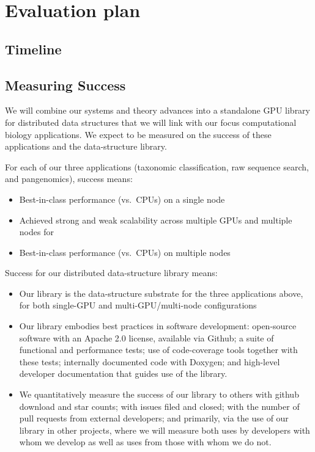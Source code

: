 \section{Evaluation plan}


\subsection{Timeline}

\subsection{Measuring Success} We will combine our systems and theory advances into a standalone GPU library for distributed data structures that we will link with our focus computational biology applications. We expect to be measured on the success of these applications and the data-structure library.

For each of our three applications (taxonomic classification, raw sequence search, and pangenomics), success means:

\begin{itemize}
  \item Best-in-class performance (vs.\ CPUs) on a single node
  \item Achieved strong and weak scalability across multiple GPUs and multiple nodes for
  \item Best-in-class performance (vs.\ CPUs) on multiple nodes
\end{itemize}

Success for our distributed data-structure library means:

\begin{itemize}
  \item Our library is the data-structure substrate for the three applications above, for both single-GPU and multi-GPU/multi-node configurations
  \item Our library embodies best practices in software development: open-source software with an Apache 2.0 license, available via Github; a suite of functional and performance tests; use of code-coverage tools together with these tests; internally documented code with Doxygen; and high-level developer documentation that guides use of the library.
  \item We quantitatively measure the success of our library to others with github download and star counts; with issues filed and closed; with the number of pull requests from external developers; and primarily, via the use of our library in other projects, where we will measure both uses by developers with whom we develop as well as uses from those with whom we do not.
\end{itemize}



